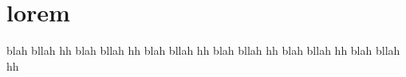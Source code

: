 \section{lorem}
blah bllah hh
blah bllah hh
blah bllah hh
blah bllah hh
blah bllah hh
blah bllah hh

